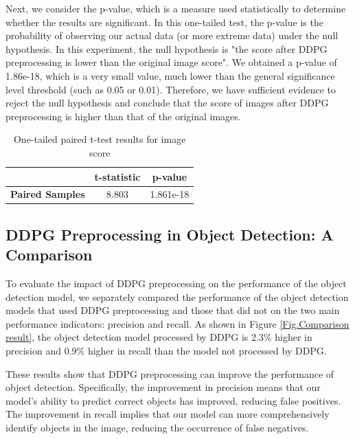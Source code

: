 \documentclass{PHlab-thesis}
\begin{document}
Next, we consider the p-value, which is a measure used statistically to determine whether the results are significant. In this one-tailed test, the p-value is the probability of observing our actual data (or more extreme data) under the null hypothesis. In this experiment, the null hypothesis is "the score after DDPG preprocessing is lower than the original image score". We obtained a p-value of 1.86e-18, which is a very small value, much lower than the general significance level threshold (such as 0.05 or 0.01). Therefore, we have sufficient evidence to reject the null hypothesis and conclude that the score of images after DDPG preprocessing is higher than that of the original images.

\begin{table}[H]
    \centering
    \label{table:t_test_results} 
    \caption{One-tailed paired t-test results for image score}
    \begin{tabular}{c c c}
        \toprule
        & \textbf{t-statistic} & \textbf{p-value} \\
        \midrule
        \textbf{Paired Samples} & 8.803 & 1.861e-18 \\
        \bottomrule
    \end{tabular}
\end{table}

\subsection{DDPG Preprocessing in Object Detection: A Comparison}
To evaluate the impact of DDPG preprocessing on the performance of the object detection model, we separately compared the performance of the object detection models that used DDPG preprocessing and those that did not on the two main performance indicators: precision and recall. As shown in Figure \ref{Fig.Comparison result}, the object detection model processed by DDPG is 2.3\% higher in precision and 0.9\% higher in recall than the model not processed by DDPG.

These results show that DDPG preprocessing can improve the performance of object detection. Specifically, the improvement in precision means that our model's ability to predict correct objects has improved, reducing false positives. The improvement in recall implies that our model can more comprehensively identify objects in the image, reducing the occurrence of false negatives.
\end{document}
